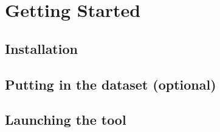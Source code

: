 \section{Getting Started}
\label{sec:start}

\subsection{Installation}


\subsection{Putting in the dataset (optional)}


\subsection{Launching the tool}
